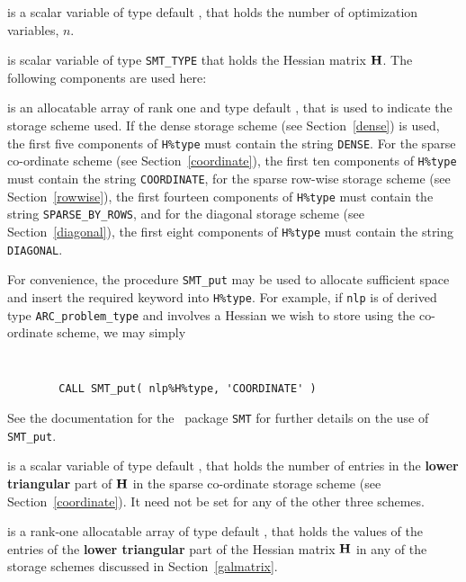 \documentclass{galahad}
\newcommand{\packagename}{ARC}
\begin{document}
\begin{description}

 is a scalar variable of type default \integer,
 that holds the number of optimization variables, $n$.

 is scalar variable of type {\tt SMT\_TYPE}
that holds the Hessian matrix ${\mathbf{H}}$. The following components
are used here:

\begin{description}

 is an allocatable array of rank one and type default
\character, that
is used to indicate the storage scheme used. If the dense storage scheme
(see Section~\ref{dense}) is used,
the first five components of {\tt H\%type} must contain the
string {\tt DENSE}.
For the sparse co-ordinate scheme (see Section~\ref{coordinate}),
the first ten components of {\tt H\%type} must contain the
string {\tt COORDINATE},
for the sparse row-wise storage scheme (see Section~\ref{rowwise}),
the first fourteen components of {\tt H\%type} must contain the
string {\tt SPARSE\_BY\_ROWS},
and for the diagonal storage scheme (see Section~\ref{diagonal}),
the first eight components of {\tt H\%type} must contain the
string {\tt DIAGONAL}.

For convenience, the procedure {\tt SMT\_put}
may be used to allocate sufficient space and insert the required keyword
into {\tt H\%type}.
For example, if {\tt nlp} is of derived type {\tt \packagename\_problem\_type}
and involves a Hessian we wish to store using the co-ordinate scheme,
we may simply
{\tt
\begin{verbatim}
        CALL SMT_put( nlp%H%type, 'COORDINATE' )
\end{verbatim}
}
\noindent
See the documentation for the \galahad\ package {\tt SMT}
for further details on the use of {\tt SMT\_put}.

 is a scalar variable of type default \integer, that
holds the number of entries in the {\bf lower triangular} part of ${\mathbf{H}}$
in the sparse co-ordinate storage scheme (see Section~\ref{coordinate}).
It need not be set for any of the other three schemes.

 is a rank-one allocatable array of type default \realdp, that holds
the values of the entries of the {\bf lower triangular} part
of the Hessian matrix ${\mathbf{H}}$ in any of the
storage schemes discussed in Section~\ref{galmatrix}.


\end{description}
\end{description}
\end{document}
